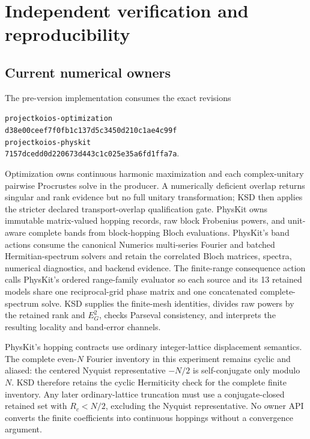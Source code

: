 \documentclass[11pt]{article}
\begin{document}
\section{Independent verification and reproducibility}

\subsection{Current numerical owners}

The pre-version implementation consumes the exact revisions
\begin{center}
\small
\texttt{projectkoios-optimization}\\
\texttt{d38e00ceef7f0fb1c137d5c3450d210c1ae4c99f}\\[2pt]
\texttt{projectkoios-physkit}\\
\texttt{7157dcedd0d220673d443c1c025e35a6fd1ffa7a}.
\end{center}
Optimization owns continuous harmonic maximization and each complex-unitary pairwise
Procrustes solve in the producer. A numerically deficient overlap returns singular and
rank evidence but no full unitary transformation; KSD then applies the stricter declared
transport-overlap qualification gate. PhysKit owns immutable matrix-valued hopping
records, raw block Frobenius powers, and unit-aware complete bands from block-hopping
Bloch evaluations. PhysKit's band actions consume the canonical Numerics multi-series Fourier and batched
Hermitian-spectrum solvers and retain the correlated Bloch matrices, spectra, numerical
diagnostics, and backend evidence. The finite-range consequence action calls PhysKit's
ordered range-family evaluator so each source and its 13 retained models share one
reciprocal-grid phase matrix and one concatenated complete-spectrum solve. KSD supplies the finite-mesh identities, divides raw
powers by the retained rank and $E_G^2$, checks Parseval consistency, and interprets the
resulting locality and band-error channels.

PhysKit's hopping contracts use ordinary integer-lattice displacement semantics. The
complete even-$N$ Fourier inventory in this experiment remains cyclic and aliased: the
centered Nyquist representative $-N/2$ is self-conjugate only modulo $N$. KSD therefore
retains the cyclic Hermiticity check for the complete finite inventory. Any later
ordinary-lattice truncation must use a conjugate-closed retained set with
$R_c<N/2$, excluding the Nyquist representative. No owner API converts the finite
coefficients into continuous hoppings without a convergence argument.
\end{document}

